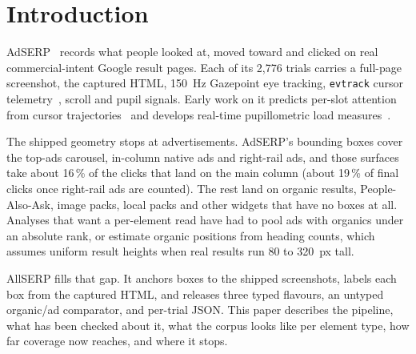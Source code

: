 \documentclass[sigconf,authorversion,natbib=true]{acmart}
\begin{document}


\maketitle

\section{Introduction}\label{sec:intro}

AdSERP~\cite{latifzadeh2025adserp} records what people looked at, moved toward and clicked on real commercial-intent Google result pages. Each of its 2,776 trials carries a full-page screenshot, the captured HTML, 150~Hz Gazepoint eye tracking, \texttt{evtrack} cursor telemetry~\cite{leiva2013evtrack}, scroll and pupil signals. Early work on it predicts per-slot attention from cursor trajectories~\cite{villaizan2025adsight} and develops real-time pupillometric load measures~\cite{duchowski2026rtlfhf,jayawardena2025ripa2}.

The shipped geometry stops at advertisements. AdSERP's bounding boxes cover the top-ads carousel, in-column native ads and right-rail ads, and those surfaces take about 16\,\% of the clicks that land on the main column (about 19\,\% of final clicks once right-rail ads are counted). The rest land on organic results, People-Also-Ask, image packs, local packs and other widgets that have no boxes at all. Analyses that want a per-element read have had to pool ads with organics under an absolute rank, or estimate organic positions from heading counts, which assumes uniform result heights when real results run 80 to 320~px tall.

AllSERP fills that gap. It anchors boxes to the shipped screenshots, labels each box from the captured HTML, and releases three typed flavours, an untyped organic/ad comparator, and per-trial JSON. This paper describes the pipeline, what has been checked about it, what the corpus looks like per element type, how far coverage now reaches, and where it stops.
\end{document}
